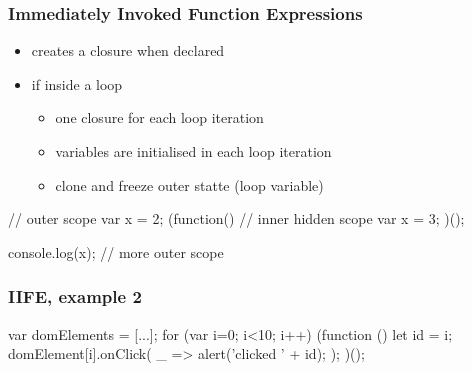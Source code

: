 \begin{frame}[fragile] \frametitle{Immediately Invoked Function Expressions}
\begin{itemize}
  \item creates a closure when declared
  \item if inside a loop
  \begin{itemize}
    \item one closure for each loop iteration
    \item variables are initialised in each loop iteration
    \item clone and freeze outer statte (loop variable)
  \end{itemize}
\end{itemize}

\begin{CodeBox}{}
// outer scope
var x = 2;
(function() {
  // inner hidden scope
  var x = 3;
})();

console.log(x);
// more outer scope
\end{CodeBox}
\end{frame}

\begin{frame}[fragile] \frametitle{IIFE, example 2}

\begin{CodeBox}{}
var domElements = [...];
for (var i=0; i<10; i++) {
  (function () {
    let id = i;
    domElement[i].onClick(
      _ => { alert('clicked ' + id); }
    );
  })();  
}
\end{CodeBox}
\end{frame}

